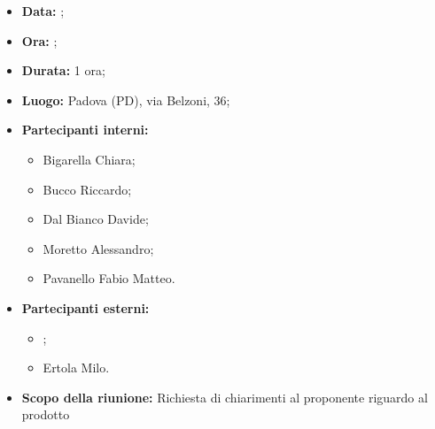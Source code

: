 \begin{itemize}
	\item \textbf{Data:} ;
	\item \textbf{Ora:} ;
	\item \textbf{Durata:} 1 ora;
	\item \textbf{Luogo:} Padova (PD), via Belzoni, 36;
	\item \textbf{Partecipanti interni:}
	\begin{itemize}
		\item Bigarella Chiara;
		\item Bucco Riccardo;
		\item Dal Bianco Davide;
		\item Moretto Alessandro;
		\item Pavanello Fabio Matteo.
	\end{itemize}
	\item \textbf{Partecipanti esterni:}
	\begin{itemize}
		\item \proponente;
		\item Ertola Milo.
	\end{itemize}
	\item \textbf{Scopo della riunione:} Richiesta di chiarimenti al proponente riguardo al prodotto
\end{itemize}
\newpage
